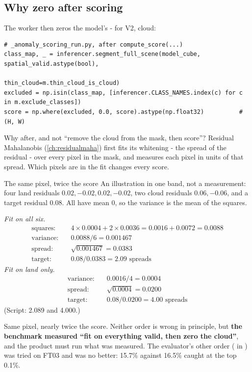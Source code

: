\subsection{Why zero after scoring}

The worker then zeros the model's  - for V2, cloud:

\begin{lstlisting}
# _anomaly_scoring_run.py, after compute_score(...)
class_map, _ = inferencer.segment_full_scene(model_cube, spatial_valid.astype(bool),
                                             thin_cloud=m.thin_cloud_is_cloud)
excluded = np.isin(class_map, [inferencer.CLASS_NAMES.index(c) for c in m.exclude_classes])
score = np.where(excluded, 0.0, score).astype(np.float32)          # (H, W)
\end{lstlisting}

Why after, and not ``remove the cloud from the mask, then score''? Residual Mahalanobis (\cref{ch:residualmaha}) first
fits its whitening - the spread of the residual - over every pixel in the mask, and measures each pixel in units of that
spread. Which pixels are in the fit changes every score.

\begin{worked}[label={we:shipping:fitset}]{The same pixel, twice the score}
An illustration in one band, not a measurement\tagA: four land residuals $0.02, -0.02, 0.02, -0.02$, two cloud residuals
$0.06, -0.06$, and a target residual $0.08$. All have mean 0, so the variance is the mean of the squares.

\emph{Fit on all six.}
\begin{align*}
\text{squares:}\quad & 4 \times 0.0004 + 2 \times 0.0036 = 0.0016 + 0.0072 = 0.0088\\
\text{variance:}\quad & 0.0088 / 6 = 0.001467\\
\text{spread:}\quad & \sqrt{0.001467} = 0.0383\\
\text{target:}\quad & 0.08 / 0.0383 = 2.09 \text{ spreads}
\end{align*}
\emph{Fit on land only.}
\begin{align*}
\text{variance:}\quad & 0.0016 / 4 = 0.0004\\
\text{spread:}\quad & \sqrt{0.0004} = 0.0200\\
\text{target:}\quad & 0.08 / 0.0200 = 4.00 \text{ spreads}
\end{align*}
(Script: 2.089 and 4.000\tagC.)
\end{worked}

Same pixel, nearly twice the score. Neither order is wrong in principle, but \textbf{the benchmark measured ``fit on
everything valid, then zero the cloud''}, and the product must run what was measured. The evaluator's other order
( in ) was tried on FT03 and was no better: 15.7\% against 16.5\%
caught at the top 0.1\%.

